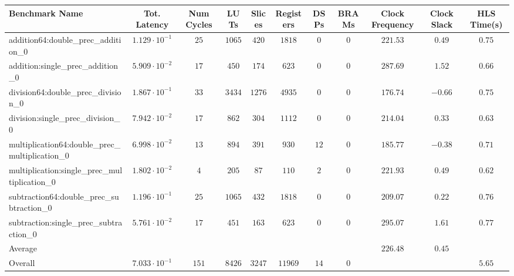 \begin{tabular}{|l|c|c|c|c|c|c|c|c|c|c|}
\hline
Benchmark Name                                   & Tot. Latency            & Num Cycles & LUTs     & Slices   & Registers & DSPs   & BRAMs & Clock Frequency & Clock Slack & HLS Time(s) \\
\hline
addition64:double\_prec\_addition\_0             & $ 1.129 \cdot 10^{-1} $ & $ 25     $ & $ 1065 $ & $ 420  $ & $ 1818  $ & $ 0  $ & $ 0 $ & $ 221.53      $ & $ 0.49    $ & $ 0.75    $ \\
addition:single\_prec\_addition\_0               & $ 5.909 \cdot 10^{-2} $ & $ 17     $ & $ 450  $ & $ 174  $ & $ 623   $ & $ 0  $ & $ 0 $ & $ 287.69      $ & $ 1.52    $ & $ 0.66    $ \\
division64:double\_prec\_division\_0             & $ 1.867 \cdot 10^{-1} $ & $ 33     $ & $ 3434 $ & $ 1276 $ & $ 4935  $ & $ 0  $ & $ 0 $ & $ 176.74      $ & $ -0.66   $ & $ 0.75    $ \\
division:single\_prec\_division\_0               & $ 7.942 \cdot 10^{-2} $ & $ 17     $ & $ 862  $ & $ 304  $ & $ 1112  $ & $ 0  $ & $ 0 $ & $ 214.04      $ & $ 0.33    $ & $ 0.63    $ \\
multiplication64:double\_prec\_multiplication\_0 & $ 6.998 \cdot 10^{-2} $ & $ 13     $ & $ 894  $ & $ 391  $ & $ 930   $ & $ 12 $ & $ 0 $ & $ 185.77      $ & $ -0.38   $ & $ 0.71    $ \\
multiplication:single\_prec\_multiplication\_0   & $ 1.802 \cdot 10^{-2} $ & $ 4      $ & $ 205  $ & $ 87   $ & $ 110   $ & $ 2  $ & $ 0 $ & $ 221.93      $ & $ 0.49    $ & $ 0.62    $ \\
subtraction64:double\_prec\_subtraction\_0       & $ 1.196 \cdot 10^{-1} $ & $ 25     $ & $ 1065 $ & $ 432  $ & $ 1818  $ & $ 0  $ & $ 0 $ & $ 209.07      $ & $ 0.22    $ & $ 0.76    $ \\
subtraction:single\_prec\_subtraction\_0         & $ 5.761 \cdot 10^{-2} $ & $ 17     $ & $ 451  $ & $ 163  $ & $ 623   $ & $ 0  $ & $ 0 $ & $ 295.07      $ & $ 1.61    $ & $ 0.77    $ \\
\hline
Average                                          & $                     $ & $        $ & $      $ & $      $ & $       $ & $    $ & $   $ & $ 226.48      $ & $ 0.45    $ & $         $ \\
\hline
Overall                                          & $ 7.033 \cdot 10^{-1} $ & $ 151    $ & $ 8426 $ & $ 3247 $ & $ 11969 $ & $ 14 $ & $ 0 $ & $             $ & $         $ & $ 5.65    $ \\
\hline
\end{tabular}
